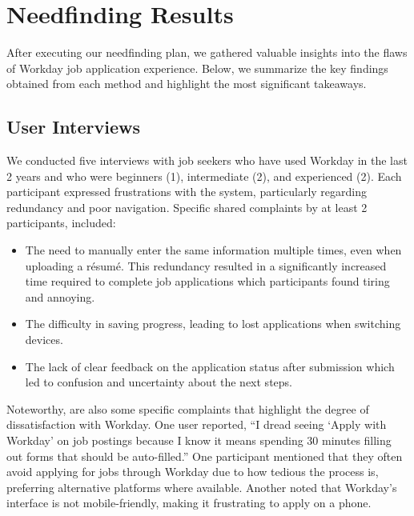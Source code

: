 \documentclass[
	letterpaper, %
]{jdf}
\begin{document}
\begin{sloppypar}
\section{Needfinding Results }
After executing our needfinding plan, we gathered valuable insights into the flaws of Workday job application experience. Below, we summarize the key findings obtained from each method and highlight the most significant takeaways.

\subsection{User Interviews}
We conducted five interviews with job seekers who have used Workday in the last 2 years and who were beginners (1), intermediate (2), and experienced (2). Each participant expressed frustrations with the system, particularly regarding redundancy and poor navigation. Specific shared complaints by at least 2 participants, included:
\begin{itemize}
    \item The need to manually enter the same information multiple times, even when uploading a résumé. This redundancy resulted in a significantly increased time required to complete job applications which participants found tiring and annoying.
    \item The difficulty in saving progress, leading to lost applications when switching devices.
    \item The lack of clear feedback on the application status after submission which led to confusion and uncertainty about the next steps. 
\end{itemize}
Noteworthy, are also some specific complaints that highlight the degree of dissatisfaction with Workday. One user reported, “I dread seeing ‘Apply with Workday’ on job postings because I know it means spending 30 minutes filling out forms that should be auto-filled.” One participant mentioned that they often avoid applying for jobs through Workday due to how tedious the process is, preferring alternative platforms where available. Another noted that Workday’s interface is not mobile-friendly, making it frustrating to apply on a phone.
\hfill \break


\end{sloppypar}
\end{document}
